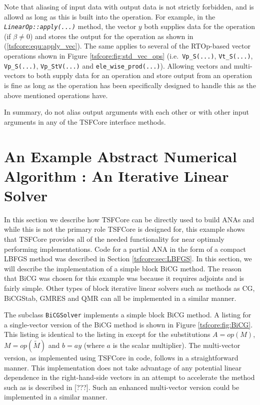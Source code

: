 Note that aliasing of input data with output data is not strictly
forbidden, and is allowd as long as this is built into the operation.
For example, in the \texttt{\textit{LinearOp\-::apply(\-...)}} method,
the vector $y$ both supplies data for the operation (if $\beta \ne 0$)
and stores the output for the operation as shown in
(\ref{tsfcore:equ:apply_vec}).  The same applies to several of the
RTOp-based vector operations shown in Figure
\ref{tsfcore:fig:std_vec_ops} (i.e.~\texttt{Vp\_S(...)},
\texttt{Vt\_S(...)}, \texttt{Vp\_S(...)}, \texttt{Vp\_StV(...)}
and \texttt{ele\_wise\_prod(...)}).  Allowing vectors and
multi-vectors to both supply data for an operation and store output
from an operation is fine as long as the operation has been
specifically designed to handle this as the above mentioned operations
have.

In summary, do not alias output arguments with each other or with
other input arguments in any of the TSFCore interface methods.

%
\section{An Example Abstract Numerical Algorithm : An Iterative Linear Solver}
\label{tsfcore:sec:ANA_iter_solver_example}
%

In this section we describe how TSFCore can be directly used to build
ANAs and while this is not the primary role TSFCore is designed for, this
example shows that TSFCore provides all of the needed functionality for
near optimaly performing implementations.  Code for a partial ANA in
the form of a compact LBFGS method was described in Section
\ref{tsfcore:sec:LBFGS}.  In this section, we will describe the
implementation of a simple block BiCG
\cite{ref:tmpls_for_iter_systems} method.  The reason that BiCG was
chosen for this example was because it requires adjoints and is fairly
simple.  Other types of block iterative linear solvers such as methods
as CG, BiCGStab, GMRES and QMR \cite{ref:tmpls_for_iter_systems} can
all be implemented in a similar manner.

The subclass \texttt{BiCG\-Solver} implements a simple block BiCG
method.  A listing for a single-vector version of the BiCG method is
shown in Figure \ref{tsfcore:fig:BiCG}.  This listing is identical to
the listing in \cite{ref:tmpls_for_iter_systems} except for the
substitutions $A = op(M)$, $M = op(\tilde{M})$ and $b =a y$ (where $a$
is the scalar multiplier).  The multi-vector version, as implemented
using TSFCore in code, follows in a straightforward manner.  This
implementation does not take advantage of any potential linear
dependence in the right-hand-side vectors in an attempt to accelerate
the method such as is described in [???].  Such an enhanced
multi-vector version could be implemented in a similar manner.

